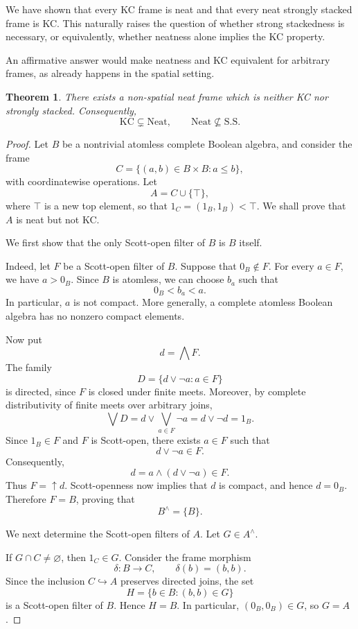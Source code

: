 \documentclass[11pt]{amsart}
\theoremstyle{plain}
\newtheorem{thm}{Theorem}[section]
\theoremstyle{definition}
\begin{document}
We have shown that every KC frame is neat
and that every neat strongly stacked frame
is KC. This naturally raises the question
of whether strong stackedness is necessary,
or equivalently, whether neatness alone
implies the KC property.

An affirmative answer would make neatness
and KC equivalent for arbitrary frames,
as already happens in the spatial setting.

\begin{thm}\label{NeatNoKC}
There exists a non-spatial neat frame
which is neither KC nor strongly stacked.
Consequently,
\[
\mathrm{KC}\subsetneq\mathrm{Neat},
\qquad
\mathrm{Neat}\not\subseteq\mathrm{S.S.}
\]
\end{thm}


\begin{proof}
Let $B$ be a nontrivial atomless complete Boolean
algebra, and consider the frame
\[
C=\{(a,b)\in B\times B:a\leq b\},
\]
with coordinatewise operations. Let
\[
A=C\cup\{\top\},
\]
where $\top$ is a new top element, so that
$1_C=(1_B,1_B)<\top$. We shall prove that
$A$ is neat but not KC.


We first show that the only Scott-open filter
of $B$ is $B$ itself.

Indeed, let $F$ be a Scott-open filter of $B$.
Suppose that $0_B\notin F$. For every $a\in F$,
we have $a>0_B$. Since $B$ is atomless, we can
choose $b_a$ such that
\[
0_B<b_a<a.
\]
In particular, $a$ is not compact. More generally,
a complete atomless Boolean algebra has no
nonzero compact elements.

Now put
\[
d=\bigwedge F.
\]
The family
\[
D=\{d\vee\neg a:a\in F\}
\]
is directed, since $F$ is closed under finite
meets. Moreover, by complete distributivity
of finite meets over arbitrary joins,
\[
\bigvee D
=d\vee\bigvee_{a\in F}\neg a
=d\vee\neg d
=1_B.
\]
Since $1_B\in F$ and $F$ is Scott-open, there
exists $a\in F$ such that
\[
d\vee\neg a\in F.
\]
Consequently,
\[
d=a\wedge(d\vee\neg a)\in F.
\]
Thus $F=\uparrow d$. Scott-openness now implies
that $d$ is compact, and hence $d=0_B$.
Therefore $F=B$, proving that
\[
B^\wedge=\{B\}.
\]

We next determine the Scott-open filters of $A$.
Let $G\in A^\wedge$.

If $G\cap C\neq\varnothing$, then $1_C\in G$.
Consider the frame morphism
\[
\delta:B\longrightarrow C,\qquad
\delta(b)=(b,b).
\]
Since the inclusion $C\hookrightarrow A$
preserves directed joins, the set
\[
H=\{b\in B:(b,b)\in G\}
\]
is a Scott-open filter of $B$. Hence $H=B$.
In particular, $(0_B,0_B)\in G$, so $G=A$.


\end{proof}
\end{document}
